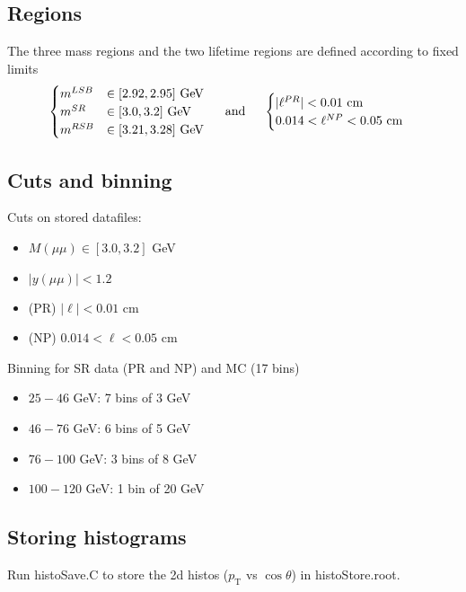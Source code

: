 \documentclass{article}
\newcommand{\pt}{p_\text{T}}
\newcommand{\cost}{\cos\theta}
\begin{document}
\subsection{Regions} 

The three mass regions and the two lifetime regions are defined according to fixed limits
\begin{equation}\begin{cases}
m^{LSB}&\in[2.92, 2.95] \text{ GeV}\\
m^{SR}&\in[3.0, 3.2]  \text{ GeV}\\
m^{RSB}&\in[3.21, 3.28]  \text{ GeV}\\
\end{cases}\hspace{0.5cm}\text{and}\hspace{0.5cm}
\begin{cases}
|\ell^{PR}| < 0.01\text{ cm} \\
0.014 < \ell^{NP} < 0.05\text{ cm}
\end{cases}
\end{equation}

\subsection{Cuts and binning} 

Cuts on stored datafiles:
\begin{itemize}
\item $M(\mu\mu)\in[3.0,3.2]$ GeV
\item $|y(\mu\mu)|<1.2$
\item (PR) $|\ell|<0.01$ cm
\item (NP) $0.014 < \ell < 0.05$ cm
\end{itemize}

Binning for SR data (PR and NP) and MC (17 bins)
\begin{itemize}
\item $25-46$ GeV: 7 bins of 3 GeV
\item $46-76$ GeV: 6 bins of 5 GeV
\item $76-100$ GeV: 3 bins of 8 GeV
\item $100-120$ GeV: 1 bin of 20 GeV
\end{itemize}

\subsection{Storing histograms}

Run histoSave.C to store the 2d histos ($\pt$ vs $\cost$) in histoStore.root.
\end{document}
